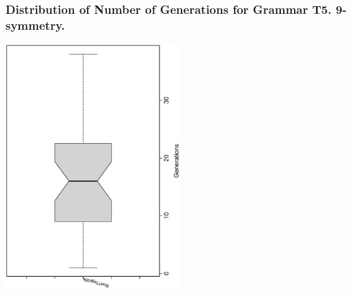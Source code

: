  \begin{frame}
 \frametitle{ Distribution of Number of Generations for Grammar T5. 9-symmetry. }
 \begin{center}
\includegraphics[width=0.5\textwidth, angle=-90]
{ExpFboxplottGenerations007.eps}
 \end{center}
 \label{ExpFboxplottGenerations007.eps}  
 \end{frame}

